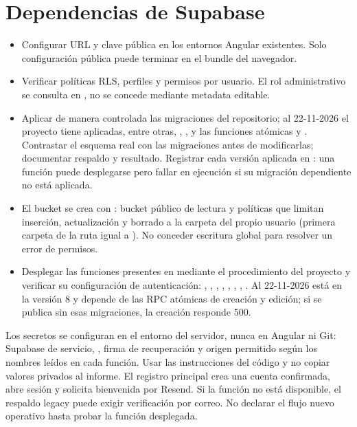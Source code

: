 \documentclass[11pt,a4paper]{article}
\begin{document}
\section{Dependencias de Supabase}
\begin{itemize}
\item Configurar URL y clave pública en los entornos Angular existentes. Solo
configuración pública puede terminar en el bundle del navegador.
\item Verificar políticas RLS, perfiles y permisos por usuario. El rol administrativo
se consulta en , no se concede mediante metadata editable.
\item Aplicar de manera controlada las migraciones del repositorio; al 22-11-2026 el
proyecto tiene aplicadas, entre otras, ,
, 
y las funciones atómicas  y
. Contrastar el esquema real con
las migraciones antes de modificarlas; documentar respaldo y resultado. Registrar cada
versión aplicada en : una función puede desplegarse pero fallar
en ejecución si su migración dependiente no está aplicada.
\item El bucket  se crea con :
bucket público de lectura y políticas que limitan inserción, actualización y borrado a la
carpeta del propio usuario (primera carpeta de la ruta igual a ).
No conceder escritura global para resolver un error de permisos.
\item Desplegar las funciones presentes en  mediante el
procedimiento del proyecto y verificar su configuración de autenticación:
, , ,
, , ,
, . Al 22-11-2026
 está en la versión 8 y depende de las RPC atómicas de creación y
edición; si se publica sin esas migraciones, la creación responde 500.
\end{itemize}

Los secretos se configuran en el entorno del servidor, nunca en Angular ni Git:
Supabase de servicio, , firma de recuperación y origen permitido
según los nombres leídos en cada función. Usar las instrucciones del código y no
copiar valores privados al informe. El registro principal crea una cuenta confirmada,
abre sesión y solicita bienvenida por Resend. Si la función no está disponible, el
respaldo legacy puede exigir verificación por correo. No declarar el flujo nuevo
operativo hasta probar la función desplegada.
\end{document}
